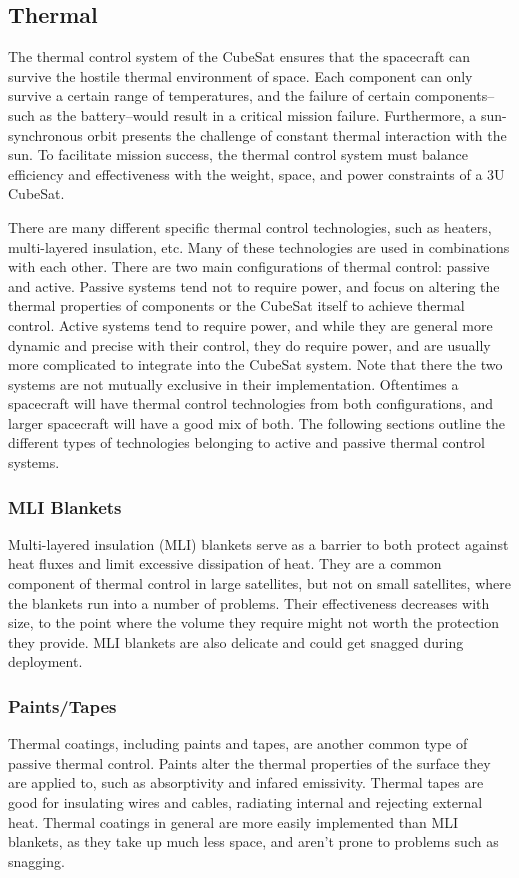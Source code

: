 \documentclass{ece}
\begin{document}
\subsection{Thermal}
The thermal control system of the CubeSat ensures that the spacecraft can survive the hostile thermal environment of space. Each component can only survive a certain range of temperatures, and the failure of certain components--such as the battery--would result in a critical mission failure. Furthermore, a sun-synchronous orbit presents the challenge of constant thermal interaction with the sun. To facilitate mission success, the thermal control system must balance efficiency and effectiveness with the weight, space, and power constraints of a 3U CubeSat. 

There are many different specific thermal control technologies, such as heaters, multi-layered insulation, etc. Many of these technologies are used in combinations with each other. There are two main configurations of thermal control: passive and active. Passive systems tend not to require power, and focus on altering the thermal properties of components or the CubeSat itself to achieve thermal control. Active systems tend to require power, and while they are general more dynamic and precise with their control, they do require power, and are usually more complicated to integrate into the CubeSat system. Note that there the two systems are not mutually exclusive in their implementation. Oftentimes a spacecraft will have thermal control technologies from both configurations, and larger spacecraft will have a good mix of both. The following sections outline the different types of technologies belonging to active and passive thermal control systems. 
\subsubsection{MLI Blankets}
Multi-layered insulation (MLI) blankets serve as a barrier to both protect against heat fluxes and limit excessive dissipation of heat. They are a common component of thermal control in large satellites, but not on small satellites, where the blankets run into a number of problems. Their effectiveness decreases with size, to the point where the volume they require might not worth the protection they provide. MLI blankets are also delicate and could get snagged during deployment. 

\subsubsection{Paints/Tapes}
Thermal coatings, including paints and tapes, are another common type of passive thermal control. Paints alter the thermal properties of the surface they are applied to, such as absorptivity and infared emissivity. Thermal tapes are good for insulating wires and cables, radiating internal and rejecting external heat. Thermal coatings in general are more easily implemented than MLI blankets, as they take up much less space, and aren't prone to problems such as snagging. 
\end{document}
